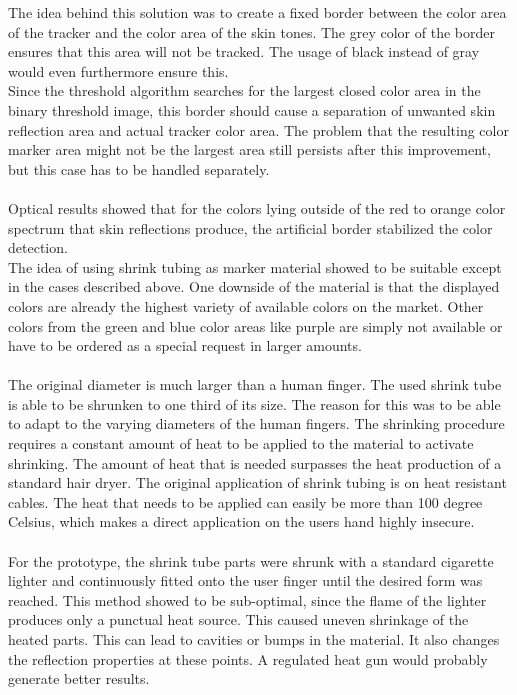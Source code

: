 The idea behind this solution was to create a fixed border between the color area of the tracker and the color area of the skin tones. The grey color of the border ensures that this area will not be tracked. The usage of black instead of gray would even furthermore ensure this. 
\\Since the threshold algorithm searches for the largest closed color area in the binary threshold image, this border should cause a separation of unwanted skin reflection area and actual tracker color area. The problem that the resulting color marker area might not be the largest area still persists after this improvement, but this case has to be handled separately.
\\\\Optical results showed that for the colors lying outside of the red to orange color spectrum that skin reflections produce, the artificial border stabilized the color detection.
\\The idea of using shrink tubing as marker material showed to be suitable except in the cases described above. One downside of the material is that the displayed colors are already the highest variety of available colors on the market. Other colors from the green and blue color areas like purple are simply not available or have to be ordered as a special request in larger amounts.
\\\\The original diameter is much larger than a human finger. The used shrink tube is able to be shrunken to one third of its size. The reason for this was to be able to adapt to the varying diameters of the human fingers. The shrinking procedure requires a constant amount of heat to be applied to the material to activate shrinking. The amount of heat that is needed surpasses the heat production of a standard hair dryer. The original application of shrink tubing is on heat resistant cables. The heat that needs to be applied can easily be more than 100 degree Celsius, which makes a direct application on the users hand highly insecure.
\\\\For the prototype, the shrink tube parts were shrunk with a standard cigarette lighter and continuously fitted onto the user finger until the desired form was reached. This method showed to  be sub-optimal, since the flame of the lighter produces only a punctual heat source. This caused uneven shrinkage of the heated parts. This can lead to cavities or bumps in the material. It  also changes the reflection properties at these points. A regulated heat gun would probably generate better results.
